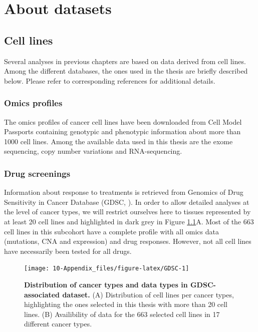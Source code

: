 \documentclass[a4paper,12pt,twoside,onecolumn,openright,final,oldfontcommands]{memoir}
\begin{document}
\appendix {}


\chapter{About datasets}\label{appendix-datasets}

\section{Cell lines}\label{appendix-cl}

Several analyses in previous chapters are based on data derived from
cell lines. Among the different databases, the ones used in the thesis
are briefly described below. Please refer to corresponding references
for additional details.

\subsection{Omics profiles}\label{omics-profiles}

The omics profiles of cancer cell lines have been downloaded from Cell
Model Passports \citep{van2019cell} containing genotypic and phenotypic
information about more than 1000 cell lines. Among the available data
used in this thesis are the exome sequencing, copy number variations and
RNA-sequencing.

\subsection{Drug screenings}\label{appendix-GDSC}

Information about response to treatments is retrieved from Genomics of
Drug Sensitivity in Cancer Database (GDSC, \citet{yang2012genomics}). In
order to allow detailed analyses at the level of cancer types, we will
restrict ourselves here to tissues represented by at least 20 cell lines
and highlighted in dark grey in Figure \ref{fig:GDSC}A. Most of the 663
cell lines in this subcohort have a complete profile with all omics data
(mutations, CNA and expression) and drug responses. However, not all
cell lines have necessarily been tested for all drugs.

\begin{figure}

{\centering \texttt{[image: 10-Appendix\_files/figure-latex/GDSC-1]} 

}

\caption[Distribution of cancer types and data types in GDSC-associated dataset]{\textbf{Distribution of cancer types and data types
in GDSC-associated dataset.} (A) Distribution of cell lines per cancer
types, highlighting the ones selected in this thesis with more than 20
cell lines. (B) Availibility of data for the 663 selected cell lines in
17 different cancer types.}\label{fig:GDSC}
\end{figure}
\end{document}
